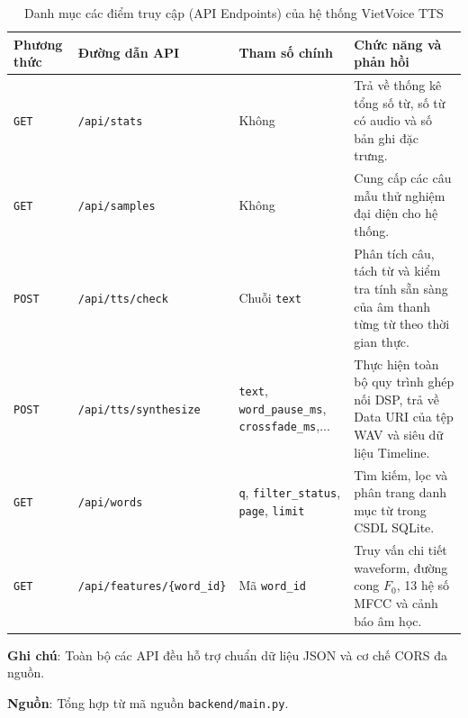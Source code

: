 \begin{table}[H]
\centering
\caption{Danh mục các điểm truy cập (API Endpoints) của hệ thống VietVoice TTS}
\label{tab:api_endpoints}
\vspace{2pt}
\begin{tabularx}{\textwidth}{p{1.6cm}p{4.6cm}p{2.7cm}X}
\toprule
\textbf{Phương thức} & \textbf{Đường dẫn API} & \textbf{Tham số chính} & \textbf{Chức năng và phản hồi} \\
\midrule
\texttt{GET} & \texttt{/api/stats} & Không & Trả về thống kê tổng số từ, số từ có audio và số bản ghi đặc trưng. \\
\addlinespace
\texttt{GET} & \texttt{/api/samples} & Không & Cung cấp các câu mẫu thử nghiệm đại diện cho hệ thống. \\
\addlinespace
\texttt{POST} & \texttt{/api/tts/check} & Chuỗi \texttt{text} & Phân tích câu, tách từ và kiểm tra tính sẵn sàng của âm thanh từng từ theo thời gian thực. \\
\addlinespace
\texttt{POST} & \texttt{/api/tts/synthesize} & \texttt{text}, \texttt{word\_pause\_ms}, \texttt{crossfade\_ms},... & Thực hiện toàn bộ quy trình ghép nối DSP, trả về Data URI của tệp WAV và siêu dữ liệu Timeline. \\
\addlinespace
\texttt{GET} & \texttt{/api/words} & \texttt{q}, \texttt{filter\_status}, \texttt{page}, \texttt{limit} & Tìm kiếm, lọc và phân trang danh mục từ trong CSDL SQLite. \\
\addlinespace
\texttt{GET} & \texttt{/api/features/\{word\_id\}} & Mã \texttt{word\_id} & Truy vấn chi tiết waveform, đường cong $F_0$, 13 hệ số MFCC và cảnh báo âm học. \\
\bottomrule
\end{tabularx}
\par\vspace{4pt}
\begin{minipage}{\textwidth}
\fontsize{12}{14}\selectfont \textbf{Ghi chú}: Toàn bộ các API đều hỗ trợ chuẩn dữ liệu JSON và cơ chế CORS đa nguồn.\par
\textbf{Nguồn}: Tổng hợp từ mã nguồn \texttt{backend/main.py}.
\end{minipage}
\end{table}
